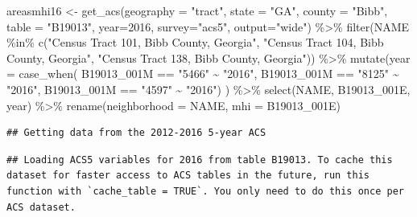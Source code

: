 \documentclass[
]{article}
\newenvironment{Shaded}{\begin{snugshade}}{\end{snugshade}}
\newcommand{\AttributeTok}[1]{\textcolor[rgb]{0.77,0.63,0.00}{#1}}
\newcommand{\DecValTok}[1]{\textcolor[rgb]{0.00,0.00,0.81}{#1}}
\newcommand{\FunctionTok}[1]{\textcolor[rgb]{0.00,0.00,0.00}{#1}}
\newcommand{\NormalTok}[1]{#1}
\newcommand{\OtherTok}[1]{\textcolor[rgb]{0.56,0.35,0.01}{#1}}
\newcommand{\SpecialCharTok}[1]{\textcolor[rgb]{0.00,0.00,0.00}{#1}}
\newcommand{\StringTok}[1]{\textcolor[rgb]{0.31,0.60,0.02}{#1}}
\begin{document}
\begin{Shaded}
\begin{Highlighting}[]
\NormalTok{areasmhi16 }\OtherTok{\textless{}{-}} \FunctionTok{get\_acs}\NormalTok{(}\AttributeTok{geography =} \StringTok{"tract"}\NormalTok{, }\AttributeTok{state =} \StringTok{"GA"}\NormalTok{, }\AttributeTok{county =} \StringTok{"Bibb"}\NormalTok{, }\AttributeTok{table =} \StringTok{"B19013"}\NormalTok{, }\AttributeTok{year=}\DecValTok{2016}\NormalTok{, }\AttributeTok{survey=}\StringTok{"acs5"}\NormalTok{, }\AttributeTok{output=}\StringTok{"wide"}\NormalTok{) }\SpecialCharTok{\%\textgreater{}\%}
\FunctionTok{filter}\NormalTok{(NAME }\SpecialCharTok{\%in\%} \FunctionTok{c}\NormalTok{(}\StringTok{"Census Tract 101, Bibb County, Georgia"}\NormalTok{, }\StringTok{"Census Tract 104, Bibb County, Georgia"}\NormalTok{, }\StringTok{"Census Tract 138, Bibb County, Georgia"}\NormalTok{)) }\SpecialCharTok{\%\textgreater{}\%}
\FunctionTok{mutate}\NormalTok{(}\AttributeTok{year =} \FunctionTok{case\_when}\NormalTok{(}
\NormalTok{  B19013\_001M }\SpecialCharTok{==} \StringTok{"5466"} \SpecialCharTok{\textasciitilde{}} \StringTok{"2016"}\NormalTok{,}
\NormalTok{  B19013\_001M }\SpecialCharTok{==} \StringTok{"8125"} \SpecialCharTok{\textasciitilde{}} \StringTok{"2016"}\NormalTok{,}
\NormalTok{  B19013\_001M }\SpecialCharTok{==} \StringTok{"4597"} \SpecialCharTok{\textasciitilde{}} \StringTok{"2016"}\NormalTok{) ) }\SpecialCharTok{\%\textgreater{}\%}
\FunctionTok{select}\NormalTok{(NAME, B19013\_001E, year) }\SpecialCharTok{\%\textgreater{}\%}
\FunctionTok{rename}\NormalTok{(}\AttributeTok{neighborhood =}\NormalTok{ NAME, }\AttributeTok{mhi =}\NormalTok{ B19013\_001E)}
\end{Highlighting}
\end{Shaded}

\begin{verbatim}
## Getting data from the 2012-2016 5-year ACS
\end{verbatim}

\begin{verbatim}
## Loading ACS5 variables for 2016 from table B19013. To cache this dataset for faster access to ACS tables in the future, run this function with `cache_table = TRUE`. You only need to do this once per ACS dataset.
\end{verbatim}
\end{document}
